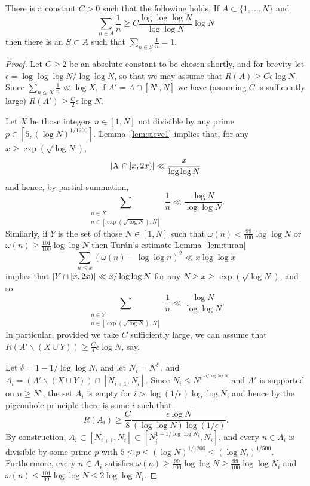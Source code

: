 \begin{theorem}\label{th:log_density_theorem}
\leanok
{}
There is a constant $C>0$ such that the following holds. If $A\subset \{1,\ldots,N\}$ and
\[\sum_{n\in A}\frac{1}{n}\geq C \frac{\log \log\log N}{\log\log N}\log N\]
then there is an $S\subset A$ such that $\sum_{n\in S}\frac{1}{n}=1$.
\end{theorem}
\begin{proof}
  \leanok
  Let $C\geq 2$ be an absolute constant to be chosen shortly, and for brevity let $\epsilon = \log\log\log N/\log\log N$, so that we may assume that $R(A)\geq C\epsilon \log N$. Since $\sum_{n\leq X}\frac{1}{n}\ll \log X$, if $A'=A\cap [N^\epsilon,N]$ we have (assuming $C$ is sufficiently large) $R(A')\geq \frac{C}{2}\epsilon\log N$.

  Let $X$ be those integers $n\in [1,N]$ not divisible by any prime $p\in [5,(\log N)^{1/1200}]$. Lemma~\ref{lem:sieve1} implies that, for any $x\geq \exp(\sqrt{\log N})$,
  \[\left\lvert X\cap[x,2x)\right\rvert\ll \frac{x}{\log\log N}\]
  and hence, by partial summation,
  \[\sum_{\substack{n\in X\\ n\in [\exp(\sqrt{\log N}),N]}}\frac{1}{n}\ll \frac{\log N}{\log\log N}.\]
  Similarly, if $Y$ is the set of those $N\in [1,N]$ such that $\omega(n) <\frac{99}{100}\log\log N$ or $\omega(n)\geq \frac{101}{100}\log\log N$ then Tur\'{a}n's estimate Lemma~\ref{lem:turan}
  \[\sum_{n\leq x}(\omega(n)-\log\log n)^2\ll x\log\log x\]
  implies that $\left\lvert Y\cap [x,2x)\right\rvert\ll x/\log\log N$ for any $N\geq x\geq \exp(\sqrt{\log N})$, and so
  \[\sum_{\substack{n\in Y\\ n\in [\exp(\sqrt{\log N}),N]}}\frac{1}{n}\ll \frac{\log N}{\log\log N}.\]
  In particular, provided we take $C$ sufficiently large, we can assume that $R(A'\backslash (X\cup Y))\geq \frac{C}{4}\epsilon \log N$, say.

  Let $\delta=1-1/\log\log N$, and let $N_i=N^{\delta^i}$, and $A_i=(A'\backslash (X\cup Y))\cap [N_{i+1},N_i]$. Since $N_i\leq N^{e^{-i/\log\log N}}$ and $A'$ is supported on $n\geq N^\epsilon$, the set $A_i$ is empty for $i> \log(1/\epsilon)\log\log N$, and hence by the pigeonhole principle there is some $i$ such that
  \[R(A_i)\geq \frac{C}{8}\frac{\epsilon\log N}{(\log\log N)\log(1/\epsilon)}.\]
  By construction, $A_i\subset [N_{i+1},N_i]\subset [N_i^{1-1/\log\log N_i},N_i]$, and every $n\in A_i$ is divisible by some prime $p$ with $5\leq p\leq (\log N)^{1/1200}\leq (\log N_i)^{1/500}$. Furthermore, every $n\in A_i$ satisfies $\omega(n)\geq \frac{99}{100}\log\log N\geq \frac{99}{100}\log\log N_i$ and $\omega(n)\leq \frac{101}{99}\log\log N\leq 2\log\log N_i$.


\end{proof}

